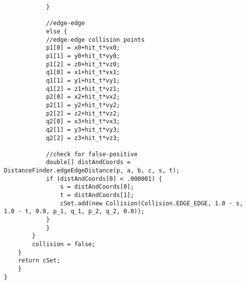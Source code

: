 \begin{lstlisting}
		    }
				
		    //edge-edge
		    else {
			//edge-edge collision points
			p1[0] = x0+hit_t*vx0;
			p1[1] = y0+hit_t*vy0;
			p1[2] = z0+hit_t*vz0;
			q1[0] = x1+hit_t*vx1;	
			q1[1] = y1+hit_t*vy1;
			q1[2] = z1+hit_t*vz1;
			p2[0] = x2+hit_t*vx2;
			p2[1] = y2+hit_t*vy2;
			p2[2] = z2+hit_t*vz2;
			q2[0] = x3+hit_t*vx3;
			q2[1] = y3+hit_t*vy3;
			q2[2] = z3+hit_t*vz3;

			//check for false-positive
			double[] distAndCoords = DistanceFinder.edgeEdgeDistance(p, a, b, c, s, t);
			if (distAndCoords[0] < .000001) {
			    s = distAndCoords[0];
			    t = distAndCoords[1];
			    cSet.add(new Collision(Collision.EDGE_EDGE, 1.0 - s, 1.0 - t, 0.0, p_1, q_1, p_2, q_2, 0.0));
			}
		    }
	    }
	    collision = false;
	}
	return cSet;
    }
}\end{lstlisting}

